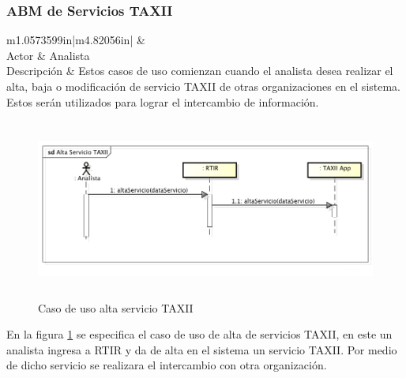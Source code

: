 \subsubsection{ABM de Servicios TAXII}

\bigskip

\begin{flushleft}
	\tablefirsthead{}
	\tablehead{}
	\tabletail{}
	\tablelasttail{}
	\begin{supertabular}{m{1.0573599in}|m{4.82056in}|}
		 &
		\\\hline
		{Actor} &
		{Analista}\\
		{Descripción} &
		{Estos casos de uso comienzan cuando el analista desea realizar el alta, baja o
			modificación de servicio TAXII de otras organizaciones en el sistema. Estos serán utilizados para lograr el intercambio
			de información.}\\\hhline{~-}
	\end{supertabular}
\end{flushleft}

\bigskip

\begin{figure}[ht!]
	\centering
	\includegraphics[width=5.7638in,height=2.3217in]{Analisis22-img/Analisis22-img023.png} 
	\caption{Caso de uso alta servicio TAXII}
	\label{fig.altaserviciotaxii}
\end{figure}
	En la figura \ref{fig.altaserviciotaxii} se especifica el caso de uso de alta de servicios TAXII, en este un analista ingresa a RTIR y da de alta
	en el sistema un servicio TAXII. Por medio de dicho servicio se realizara el intercambio con otra organización.



